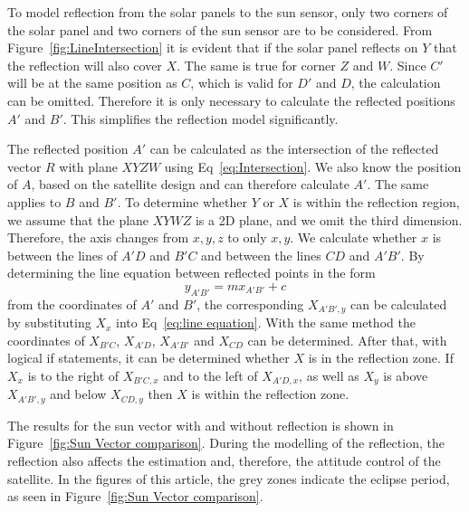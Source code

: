 \documentclass[letterpaper, 10 pt, conference]{ieeeconf}  %
\begin{document}
To model reflection from the solar panels to the sun sensor, only two corners of the solar panel and two corners of the sun sensor are to be considered. From Figure~\ref{fig:LineIntersection} it is evident that if the solar panel reflects on $Y$ that the reflection will also cover $X$. The same is true for corner $Z$ and $W$. Since $C'$ will be at the same position as $C$, which is valid for $D'$ and $D$, the calculation can be omitted. Therefore it is only necessary to calculate the reflected positions $A'$ and $B'$. This simplifies the reflection model significantly.

The reflected position $A'$ can be calculated as the intersection of the reflected vector $R$ with plane $XYZW$ using Eq~\ref{eq:Intersection}. We also know the position of $A$, based on the satellite design and can therefore calculate $A'$. The same applies to $B$ and $B'$. To determine whether $Y$ or $X$ is within the reflection region, we assume that the plane $XYWZ$ is a 2D plane, and we omit the third dimension. Therefore, the axis changes from $x, y, z$ to only $x, y$. We calculate whether $x$ is between the lines of $A'D$ and $B'C$ and between the lines $CD$ and $A'B'$. By determining the line equation between reflected points in the form 
\begin{equation}
y_{A'B'} = mx_{A'B'} + c
\label{eq:line equation}
\end{equation}
from the coordinates of $A'$ and $B'$, the corresponding $X_{A'B',y}$ can be calculated by substituting $X_x$ into Eq~\ref{eq:line equation}. With the same method the coordinates of $X_{B'C}$, $X_{A'D}$, $X_{A'B'}$ and $X_{CD}$ can be determined. After that, with logical if statements, it can be determined whether $X$ is in the reflection zone. If $X_x$ is to the right of $X_{B'C,x}$ and to the left of $X_{A'D,x}$, as well as $X_y$ is above $X_{A'B',y}$ and below $X_{CD,y}$ then $X$ is within the reflection zone. 

The results for the sun vector with and without reflection is shown in Figure~\ref{fig:Sun Vector comparison}. During the modelling of the reflection, the reflection also affects the estimation and, therefore, the attitude control of the satellite. In the figures of this article, the grey zones indicate the eclipse period, as seen in Figure~\ref{fig:Sun Vector comparison}.
\end{document}

